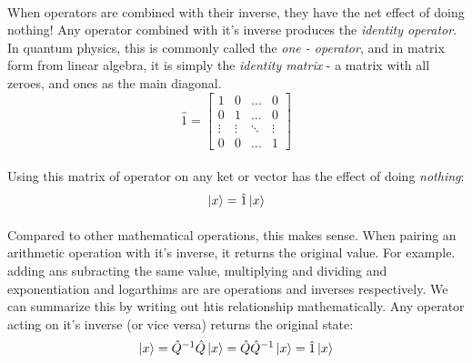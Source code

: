 \documentclass[12pt,letterpaper]{book}
\begin{document}
\paragraph*{}When operators are combined with their inverse, they have the net effect of doing nothing! Any operator combined with it's inverse produces the \textit{identity operator}. In quantum physics, this is commonly called the \textit{one - operator}, and in matrix form from linear algebra, it is simply the \textit{identity matrix} - a matrix with all zeroes, and ones as the main diagonal.
\begin{equation}
\label{identity}
\hat{1} = 
\begin{bmatrix}
1 & 0 & \hdots & 0 \\
0 & 1 & \hdots & 0 \\
\vdots & \vdots & \ddots & \vdots \\
0 & 0 & \hdots & 1
\end{bmatrix}
\end{equation}

\paragraph*{}Using this matrix of operator on any ket or vector has the effect of doing \textit{nothing}:
\begin{equation}
\ket{x} = \hat{1}\ket{x}
\end{equation}
\paragraph*{}Compared to other mathematical operations, this makes sense. When pairing an arithmetic operation with it's inverse, it returns the original value. For example. adding ans subracting the same value, multiplying and dividing and exponentiation and logarthims are are operations and inverses respectively. We can summarize this by writing out htis relationship mathematically. Any operator acting on it's inverse (or vice versa) returns the original state:
\begin{equation}
\ket{x} = \hat{Q}^{-1}\hat{Q}\ket{x} = \hat{Q}\hat{Q}^{-1}\ket{x} =
 \hat{1}\ket{x} 
\end{equation}
\end{document}

